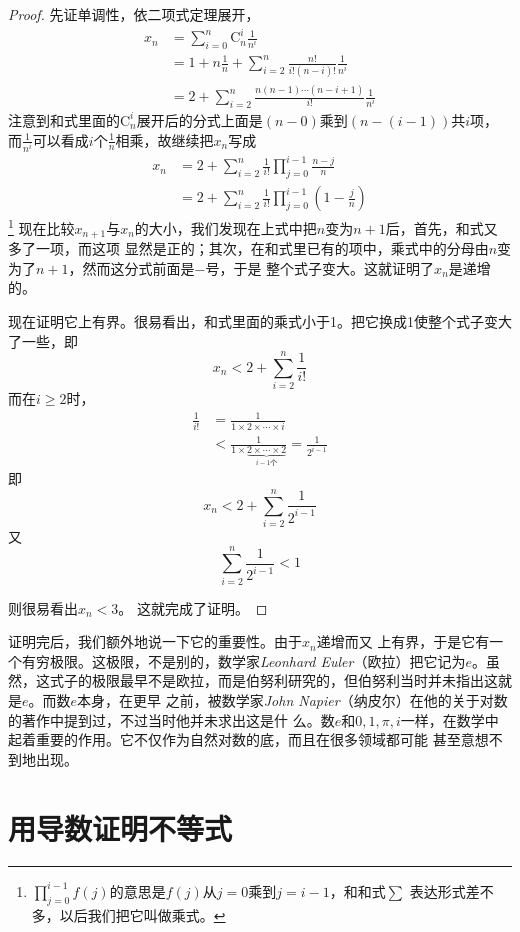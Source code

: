 \begin{proof}
先证单调性，依二项式定理展开，
\begin{align}
x_n 
&= \sum_{i = 0}^{n}{\text{C}_{n}^{i}\frac{1}{n^i}} \nonumber \\
&= 1 + n\frac{1}{n} + 
\sum_{i=2}^n{\frac{n!}{i!(n-i)!}\frac{1}{n^i}} \nonumber \\
&= 2 + \sum_{i=2}^n{\frac{n(n-1)\cdots(n-i+1)}{i!}\frac{1}{n^i}}
\end{align}
注意到和式里面的$\text{C}_{n}^{i}$展开后的分式上面是$(n-0)$乘到$(n-(i-1))$共$i$项，
而$\frac{1}{n^i}$可以看成$i$个$\frac{1}{n}$相乘，故继续把$x_n$写成
\begin{align}
x_n 
&= 2 + \sum_{i=2}^n{\frac{1}{i!}\prod_{j=0}^{i-1}{\frac{n-j}{n}}} \nonumber \\
&= 2 + \sum_{i=2}^n{\frac{1}{i!}\prod_{j=0}^{i-1}{(1-\frac{j}{n})}}
\end{align}
\footnote{$\prod_{j=0}^{i-1}{f(j)}$的意思是$f(j)$从$j=0$乘到$j=i-1$，和和式$\sum $
表达形式差不多，以后我们把它叫做乘式。}
现在比较$x_{n+1}$与$x_n$的大小，我们发现在上式中把$n$变为$n+1$后，首先，和式又	多了一项，而这项
显然是正的；其次，在和式里已有的项中，乘式中的分母由$n$变为了$n+1$，然而这分式前面是$-$号，于是
整个式子变大。这就证明了$x_n$是递增的。

现在证明它上有界。很易看出，和式里面的乘式小于1。把它换成1使整个式子变大了一些，即
\[
x_n < 2 + \sum_{i=2}^n{\frac{1}{i!}}
\]
而在$i \geq 2$时，
\begin{align*}
\frac{1}{i!} 
&= \frac{1}{1 \times 2 \times \cdots \times i} \\
&< \frac{1}{1 \times \underbrace{2 \times \cdots \times 2}_{i-1\text{个}}} 
= \frac{1}{2^{i-1}}
\end{align*}
即
\[
x_n < 2 + \sum_{i=2}^n{\frac{1}{2^{i-1}}}
\]
又
\[
\sum_{i=2}^n{\frac{1}{2^{i-1}}} < 1
\]

则很易看出$x_n < 3$。
这就完成了证明。
\end{proof}

证明完后，我们额外地说一下它的重要性。由于$x_n$递增而又
上有界，于是它有一个有穷极限。这极限，不是别的，数学家\emph{Leonhard Euler}（欧拉）把它记为$e$。虽
然，这式子的极限最早不是欧拉，而是伯努利研究的，但伯努利当时并未指出这就是$e$。而数$e$本身，在更早
之前，被数学家\emph{John Napier}（纳皮尔）在他的关于对数的著作中提到过，不过当时他并未求出这是什
么。数$e$和$0,1,\pi,i$一样，在数学中起着重要的作用。它不仅作为自然对数的底，而且在很多领域都可能
甚至意想不到地出现。

\section{用导数证明不等式}
